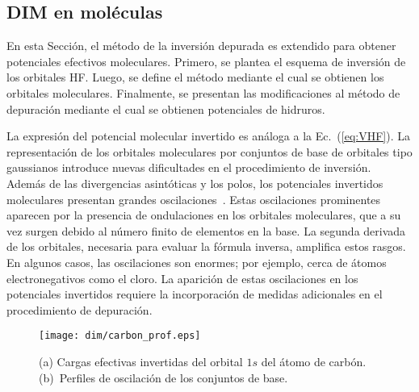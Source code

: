 \subsection{DIM en moléculas}
\label{sec:dimmoleculas}

En esta Sección, el método de la inversión depurada es extendido para 
obtener potenciales efectivos moleculares. Primero, se plantea el 
esquema de inversión de los orbitales HF. Luego, se define el método 
mediante el cual se obtienen los orbitales moleculares. Finalmente, se 
presentan las modificaciones al método de depuración mediante el cual 
se obtienen potenciales de hidruros.

La expresión del potencial molecular invertido es análoga a la 
Ec.~(\ref{eq:VHF}). La representación de los orbitales moleculares por 
conjuntos de base de orbitales tipo gaussianos introduce nuevas 
dificultades en el procedimiento de inversión. Además de las 
divergencias asintóticas y los polos, los potenciales invertidos 
moleculares presentan grandes oscilaciones~\cite{Schipper:97,Jacob:11,
Gaiduk:13}. Estas oscilaciones prominentes aparecen por la 
presencia de ondulaciones en los orbitales moleculares, que a su vez 
surgen debido al número finito de elementos en la base. La segunda 
derivada de los orbitales, necesaria para evaluar la fórmula inversa, 
amplifica estos rasgos. En algunos casos, las oscilaciones son enormes; 
por ejemplo, cerca de átomos electronegativos como el cloro. La 
aparición de estas oscilaciones en los potenciales invertidos requiere 
la incorporación de medidas adicionales en el procedimiento de 
depuración.

\begin{figure}[t]
\centering
\texttt{[image: dim/carbon\_prof.eps]}
\caption[Inversión de orbitales descritos con conjuntos de base finitos.]
{(a) Cargas efectivas invertidas del orbital $1s$ del átomo de carbón.
(b)~Perfiles de oscilación de los conjuntos de base.}
\label{fig:1sCarbon}
\end{figure}

